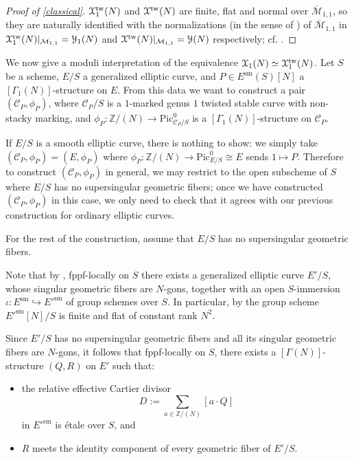 \documentclass[11pt]{amsart}
\theoremstyle{definition}
\begin{document}
\begin{proof}[Proof of \ref{classical}]
${\mathbf{\EuScript{X}}}_1^{\mathrm{tw}}(N)$ and ${\mathbf{\EuScript{X}}}^{\mathrm{tw}}(N)$ are finite, flat and normal over $\overline{\mathcal{M}}_{1,1}$, so they are naturally identified with the normalizations (in the sense of \cite[IV.3.3]{DR}) of $\overline{\mathcal{M}}_{1,1}$ in ${\mathbf{\EuScript{X}}}_1^{\mathrm{tw}}(N)|_{{\mathcal{M}}_{1,1}} = {\mathbf{\EuScript{Y}}}_1(N)$ and ${\mathbf{\EuScript{X}}}^{\mathrm{tw}}(N)|_{{\mathcal{M}}_{1,1}} = {\mathbf{\EuScript{Y}}}(N)$ respectively; cf. \cite[4.1.5]{C}.
\end{proof}

We now give a moduli interpretation of the equivalence ${\mathbf{\EuScript{X}}}_1(N) \simeq {\mathbf{\EuScript{X}}}^{\mathrm{tw}}_1(N)$. Let $S$ be a scheme, $E/S$ a generalized elliptic curve, and $P \in E^{\mathrm{sm}}(S)[N]$ a $[\Gamma_1(N)]$-structure on $E$. From this data we want to construct a pair $({\mathcal{C}}_P,\phi_P)$, where ${\mathcal{C}}_P/S$ is a $1$-marked genus $1$ twisted stable curve with non-stacky marking, and $\phi_P: \mathbb{Z}/(N) \rightarrow \mathrm{Pic}^0_{{\mathcal{C}}_P/S}$ is a $[\Gamma_1(N)]$-structure on ${\mathcal{C}}_P$.

If $E/S$ is a smooth elliptic curve, there is nothing to show: we simply take $({\mathcal{C}}_P, \phi_P) = (E,\phi_P)$ where $\phi_P: \mathbb{Z}/(N) \rightarrow \mathrm{Pic}^0_{E/S} \cong E$ sends $1 \mapsto P$. Therefore to construct $({\mathcal{C}}_P, \phi_P)$ in general, we may restrict to the open subscheme of $S$ where $E/S$ has no supersingular geometric fibers; once we have constructed $({\mathcal{C}}_P, \phi_P)$ in this case, we only need to check that it agrees with our previous construction for ordinary elliptic curves.

For the rest of the construction, assume that $E/S$ has no supersingular geometric fibers.

Note that by \cite[4.2.3]{C}, fppf-locally on $S$ there exists a generalized elliptic curve $E'/S$, whose singular geometric fibers are $N$-gons, together with an open $S$-immersion $\iota: E^{\mathrm{sm}} \hookrightarrow E'^{\mathrm{sm}}$ of group schemes over $S$. In particular, by \cite[II.1.20]{DR} the group scheme $E'^{\mathrm{sm}}[N]/S$ is finite and flat of constant rank $N^2$.

Since $E'/S$ has no supersingular geometric fibers and all its singular geometric fibers are $N$-gons, it follows that fppf-locally on $S$, there exists a $[\Gamma(N)]$-structure $(Q,R)$ on $E'$ such that: 
\begin{itemize}
  \item the relative effective Cartier divisor 
  \begin{displaymath}
  D := \sum_{a \in \mathbb{Z}/(N)} [a\cdot Q]
  \end{displaymath}
in $E'^{\mathrm{sm}}$ is \'etale over $S$, and 
   \item $R$ meets the identity component of every geometric fiber of $E'/S$.
\end{itemize}
\end{document}
